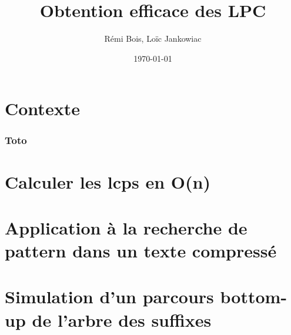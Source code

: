 \documentclass{beamer}
\title{Obtention efficace des LPC}
\author{Rémi Bois, Loïc Jankowiac}
\date{\today}
\begin{document}
\begin{frame}
  \maketitle

\end{frame}

\section{Contexte}
\label{sec:context}



\begin{frame}
  \frametitle{Toto}
\end{frame}


\section{Calculer les lcps en O(n)}
\label{sec:algo}



\section{Application à la recherche de pattern dans un texte compressé}
\label{sec:appcompress}



\section{Simulation d'un parcours bottom-up de l'arbre des suffixes}
\label{sec:appbottomup}
\end{document}
